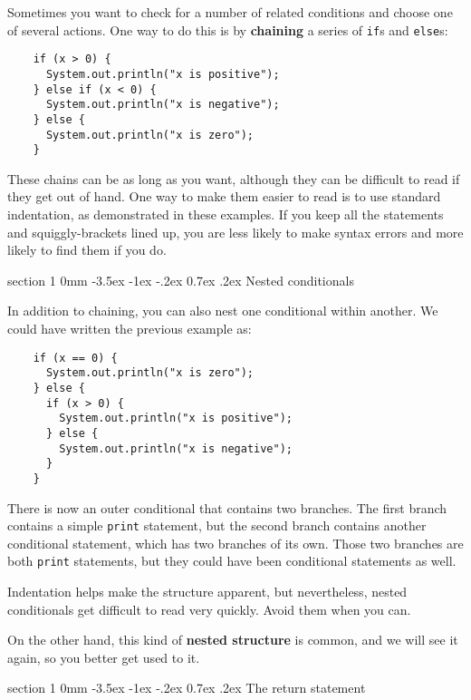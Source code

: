 \documentclass{book}
\makeatletter
\renewcommand{\section}{\@startsection 
    {section} {1} {0mm}%
    {-3.5ex \@plus -1ex \@minus -.2ex}%
    {0.7ex \@plus.2ex}%
    {\normalfont\Large\bfseries}}
\makeatother
\begin{document}
Sometimes you want to check for a number of related conditions
and choose one of several actions.  One way to do this is by
{\bf chaining} a series of {\tt if}s and {\tt else}s:

\begin{verbatim}
    if (x > 0) {
      System.out.println("x is positive");
    } else if (x < 0) {
      System.out.println("x is negative");
    } else {
      System.out.println("x is zero");
    }
\end{verbatim}
%
These chains can be as long as you want, although they can
be difficult to read if they get out of hand.  One way to
make them easier to read is to use standard indentation,
as demonstrated in these examples.  If you keep all the
statements and squiggly-brackets lined up, you are less
likely to make syntax errors and more likely to find them
if you do.


\section{Nested conditionals}

In addition to chaining, you can also nest one conditional
within another.  We could have written the previous example
as:

\begin{verbatim}
    if (x == 0) {
      System.out.println("x is zero");
    } else {
      if (x > 0) {
        System.out.println("x is positive");
      } else {
        System.out.println("x is negative");
      }
    }
\end{verbatim}
%
There is now an outer conditional that contains two branches.  The
first branch contains a simple {\tt print} statement, but the second
branch contains another conditional statement, which has two branches
of its own.  Those two branches are both {\tt print}
statements, but they could have been conditional statements as
well.

Indentation helps make the structure
apparent, but nevertheless, nested conditionals get difficult to read
very quickly.  Avoid them when you can.

On the other hand, this kind of {\bf nested structure} is common, and
we will see it again, so you better get used to it.


\section{The return statement}
\end{document}
